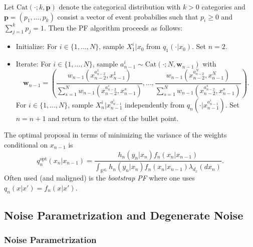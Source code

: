 \documentclass[english,13pt]{article}
\numberwithin{equation}{section}
\begin{document}
Let $\text{Cat}(\cdot;k,\mathbf{p})$ denote the categorical distribution with $k>0$ categories and $\mathbf{p}=(p_1,\ldots,p_k)$ consist a vector of event probabilies such that $p_i\geq 0$ and $\sum_{j=1}^k p_j =1$. Then the PF algorithm proceeds as follows:
\begin{itemize}
\item{Initialize: For $i\in\{1,\dots,N\}$,  sample $X_1^i|x_0$ from $q_1(\cdot|x_0)$. Set $n=2$.}
\item{Iterate: For $i\in\{1,\dots,N\}$,  sample $a_{n-1}^i\sim\text{Cat}(\cdot;N,\mathbf{w}_{n-1})$ with
$$
\mathbf{w}_{n-1}=\left( \frac{w_{n-1}(x_{n-2}^{a_{n-2}^1},x_{n-1}^{1})}
{\sum_{s=1}^N w_{n-1}(x_{n-2}^{a_{n-2}^s},x_{n-1}^s)},\dots,\frac{w_{n-1}(x_{n-2}^{a_{n-2}^N},x_{n-1}^{N})}
{\sum_{s=1}^N w_{n-1}(x_{n-2}^{a_{n-2}^s},x_{n-1}^s)}\right).
$$
For $i\in\{1,\dots,N\}$,  sample $X_n^i|x_{n-1}^{a_{n-1}^i}$ independently from $q_n(\cdot|x_{n-1}^{a_{n-1}^i})$.
Set $n=n+1$ and return to the start of the bullet point.}
\end{itemize}
The optimal proposal in terms of minimizing the variance of the weights conditional on ${x}_{n-1}$ is 
$$
q_n^{\text{opt}}(x_n|x_{n-1}) = \frac{h_n(y_n|x_n)f_n(x_n|x_{n-1})}
{\int_{\mathbb{R}^{d_x}} h_n(y_n|x_n)f_n(x_n|x_{n-1})\lambda_{d_x}(dx_n)}.
$$
Often used (and maligned) is the \emph{bootstrap PF} where one uses $q_n(x|x')=f_n(x|x')$.


\subsection{Noise Parametrization and Degenerate Noise}

\subsubsection{Noise Parametrization}
\end{document}
